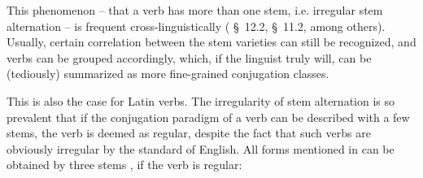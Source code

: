 \documentclass{article}
\newcommand*{\citesec}[1]{\S~{#1}}
\begin{document}
This phenomenon -- that a verb has more than one stem, i.e. irregular stem alternation
-- is frequent cross-linguistically
(\citealt{jacques2021grammar} \citesec{12.2}, \citealt{forker2020grammar} \citesec{11.2}, among others).
Usually, certain correlation between the stem varieties can still be recognized,
and verbs can be grouped accordingly,
which, if the linguist truly will, can be (tediously) summarized as more fine-grained conjugation classes.

This is also the case for Latin verbs.
The irregularity of stem alternation is so prevalent
that if the conjugation paradigm of a verb can be described with a few stems,
the verb is deemed as regular, 
despite the fact that such verbs are obviously irregular by the standard of English.
All forms mentioned in 
can be obtained by three stems \citep[\citesec{164}]{allen1903allen},
if the verb is regular:
\end{document}
